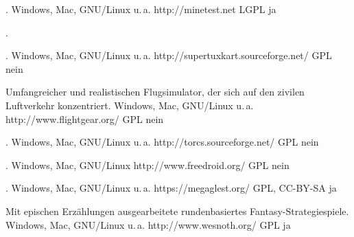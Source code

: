 



{.}
{Windows, Mac, GNU/Linux u.\,a.}
{http://minetest.net}
{LGPL}
{ja}

{.}
{} 
{}
{}
{}

{.}
{Windows, Mac, GNU/Linux u.\,a.}
{http://supertuxkart.sourceforge.net/}
{GPL}
{nein} %

{Umfangreicher und realistischen Flugsimulator, der sich auf den zivilen Luftverkehr konzentriert.}
{Windows, Mac, GNU/Linux u.\,a.}
{http://www.flightgear.org/}
{GPL}
{nein} %

{.}
{Windows, Mac, GNU/Linux u.\,a.}
{http://torcs.sourceforge.net/}
{GPL}
{nein} %


{.}
{Windows, Mac, GNU/Linux}
{http://www.freedroid.org/}
{GPL}
{nein}

{.}
{Windows, Mac, GNU/Linux u.\,a.}
{https://megaglest.org/}
{GPL, CC-BY-SA}
{ja}

{Mit epischen Erzählungen ausgearbeitete rundenbasiertes Fantasy-Strategiespiele.}
{Windows, Mac, GNU/Linux u.\,a.}
{http://www.wesnoth.org/}
{GPL}
{ja}

\backpage


